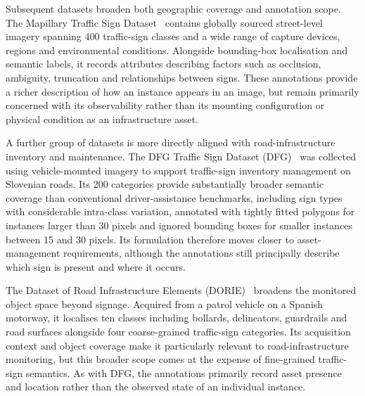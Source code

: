 Subsequent datasets broaden both geographic coverage and annotation scope. The Mapillary Traffic Sign Dataset~\cite{ertler2020mapillary} contains globally sourced street-level imagery spanning 400 traffic-sign classes and a wide range of capture devices, regions and environmental conditions. Alongside bounding-box localisation and semantic labels, it records attributes describing factors such as occlusion, ambiguity, truncation and relationships between signs. These annotations provide a richer description of how an instance appears in an image, but remain primarily concerned with its observability rather than its mounting configuration or physical condition as an infrastructure asset.

A further group of datasets is more directly aligned with road-infrastructure inventory and maintenance. The DFG Traffic Sign Dataset (DFG)~\cite{tabernik2019dfg} was collected using vehicle-mounted imagery to support traffic-sign inventory management on Slovenian roads. Its 200 categories provide substantially broader semantic coverage than conventional driver-assistance benchmarks, including sign types with considerable intra-class variation, annotated with tightly fitted polygons for instances larger than 30 pixels and ignored bounding boxes for smaller instances between 15 and 30 pixels. Its formulation therefore moves closer to asset-management requirements, although the annotations still principally describe which sign is present and where it occurs.

\noindent The Dataset of Road Infrastructure Elements (DORIE)~\cite{katsamenis2025dorie} broadens the monitored object space beyond signage. Acquired from a patrol vehicle on a Spanish motorway, it localises ten classes including bollards, delineators, guardrails and road surfaces alongside four coarse-grained traffic-sign categories. Its acquisition context and object coverage make it particularly relevant to road-infrastructure monitoring, but this broader scope comes at the expense of fine-grained traffic-sign semantics. As with DFG, the annotations primarily record asset presence and location rather than the observed state of an individual instance.

